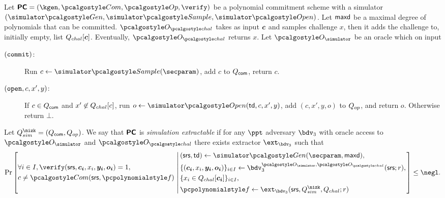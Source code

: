 \documentclass[runningheads,11pt]{llncs}
\let\spvec\vec
\let\vec\accentvec
\let\spvec\vec
\let\vec\spvec
\def\vec#1{\mathchoice{\mbox{\boldmath$\displaystyle#1$}}
  {\mbox{\boldmath$\textstyle#1$}} {\mbox{\boldmath$\scriptstyle#1$}}
  {\mbox{\boldmath$\scriptscriptstyle#1$}}}
\begin{document}
\begin{definition}
  \label{def:se_bdv3}
  Let $\PCOM = (\kgen, \com, \op, \verify)$ be a polynomial commitment scheme with a
  simulator $(\simgen, \simsample, \simopen)$. Let $\mathsf{maxd}$ be a maximal degree of
  polynomials that can be committed.  $\oraclec$ takes as input $\vec{c}$ and samples
  challenge $x$, then it adds the challenge to, initially empty, list
  $\Qchal[\vec{c}]$. Eventually, $\oraclec$ returns $x$.  Let $\oracles$ be an oracle
  which on input
     \begin{description}
     \item[$(\mathtt{commit})$:] Run $c \gets \simsample (\secparam)$, add $c$ to
       $Q_{\mathsf{com}}$, return $c$.
     \item[$(\mathtt{open}, c, x', y)$:] If $c \in Q_{\mathsf{com}}$ and $x' \not\in {Q_{chal}}[c]$, run
       $o \gets \simopen(\td, c, x', y)$, add $(c, x', y, o)$ to $Q_{op}$, and return
       $o$. Otherwise return $\bot$.
     \end{description}
     Let $\Qsim = (\Qcom, \Qop)$.  We say that $\bm{\mathsf{PC}}$ is \emph{simulation
       extractable} if for any $\ppt$ adversary $\bdv_3$ with oracle access to
     $\oracles$ and $\oraclec$ there exists extractor $\ext_{\bdv_3}$ such that
     \[
       \Pr \left[
         \begin{aligned}
           & \forall i \in I, \verify(\srs, \vec{c_i}, x_i, \vec{y_i}, \vec{o_i}) = 1, \\
           & c \neq \com(\srs, \p{f})\\
         \end{aligned}
         \,\left|\, \vphantom{
             \begin{aligned}
               & \\
               & \\
               & \\
               &
             \end{aligned}
           }
           \begin{aligned}
             & (\srs, \td) \gets \simgen(\secparam, \maxdeg),\\
             & \smallset{(\vec{c_i}, x_i, \vec{y_i}, \vec{o_i})}_{i \in I} \gets \bdv_3^{\oracles,\oraclec}(\srs; r), \\
             & \smallset{x_i \in \Qchal[\vec{c_i}]}_{i \in I}, \\
             & \p{f} \gets \ext_{\bdv_3}(\srs, \Qsim, \Qchal; r)
           \end{aligned}
         \right.\right] \leq \negl.
\]
\end{definition}
\end{document}

